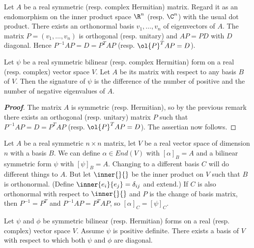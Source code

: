\begin{remark}
Let $A$ be a real symmetric (resp. complex Hermitian) matrix. Regard it as an endomorphism on the inner product space $\R^n$ (resp. $\C^n$) with the usual dot product. There exists an orthonormal basis $v_1, \dots, v_n$ of eigenvectors of $A$. The matrix $P = (v_1, \dots, v_n)$ is orthogonal (resp. unitary) and $AP = PD$ with $D$ diagonal. Hence $P^{-1}AP = D = P^TAP$ (resp. $\ol{P}^TAP = D$).
\end{remark}

\begin{proposition}
Let $\psi$ be a real symmetric bilinear (resp. complex Hermitian) form on a real (resp. complex) vector space $V$. Let $A$ be its matrix with respect to any basis $B$ of $V$. Then the signature of $\psi$ is the difference of the number of positive and the number of negative eigenvalues of $A$.
\end{proposition}

\begin{proof}[\bf Proof]
The matrix $A$ is symmetric (resp. Hermitian), so by the previous remark there exists an orthogonal (resp. unitary) matrix $P$ such that $P^{-1}AP = D = P^TAP$ (resp. $\ol{P}^TAP = D$). The assertian now follows.
\end{proof}

\begin{remark}
Let $A$ be a real symmetric $n \times n$ matrix, let $V$ be a real vector space of dimension $n$ with a basis $B$. We can define $\alpha \in End(V )$ with $[\alpha]_B = A$ and a bilinear symmetric form $\psi$ with $[\psi]_B = A$. Changing to a different basis $C$ will do different things to $A$. But let $\inner{}{}$ be the inner product on $V$ such that $B$ is orthonormal. (Define $\inner{e_i}{e_j} = \delta_{ij}$ and extend.) If $C$ is also orthonormal with respect to $\inner{}{}$ and $P$ is the change of basis matrix, then $P^{-1} = P^T$ and $P^{-1}AP = P^TAP$, so $[\alpha]_C = [\psi]_C$.
\end{remark}

\begin{theorem}
Let $\psi$ and $\phi$ be symmetric bilinear (resp. Hermitian) forms on a real (resp. complex) vector space $V$. Assume $\psi$ is positive definite. There exists a basis of $V$ with respect to which both $\psi$ and $\phi$ are diagonal.
\end{theorem}

